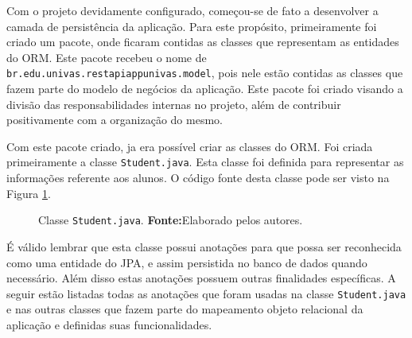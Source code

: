	\par Com o projeto devidamente configurado, começou-se de fato a desenvolver a
camada de persistência da aplicação. Para este propósito, primeiramente foi
criado um pacote, onde ficaram contidas as classes que representam as entidades
do ORM. Este pacote recebeu o nome de
\texttt{br.edu.univas.restapiappunivas.model},  pois nele estão contidas as
classes que fazem parte do modelo de negócios da aplicação. Este pacote foi
criado visando a divisão das responsabilidades internas no projeto, além de
contribuir positivamente com a organização do mesmo. 
	
	\par Com este pacote criado, ja era possível criar as classes do ORM. Foi
criada primeiramente a classe \texttt{Student.java}. Esta classe foi definida
para representar as informações referente aos alunos. O código fonte desta
classe pode ser visto na Figura \ref{fig:desws11}.
	
	
	\begin{figure}[h!]
		
		\caption[Classe Student.java]{Classe \texttt{Student.java}.
			\textbf{Fonte:}Elaborado pelos autores.}
		\label{fig:desws11}
	\end{figure}
	
	\pagebreak
	
	\par É válido lembrar que esta classe possui anotações para que possa ser
reconhecida como uma entidade do JPA, e assim persistida no banco de dados
quando necessário. Além disso estas anotações possuem outras finalidades
específicas. A seguir estão listadas todas as anotações  que foram usadas na
classe \texttt{Student.java} e nas outras classes que fazem parte do mapeamento
objeto relacional da aplicação e definidas suas funcionalidades.

